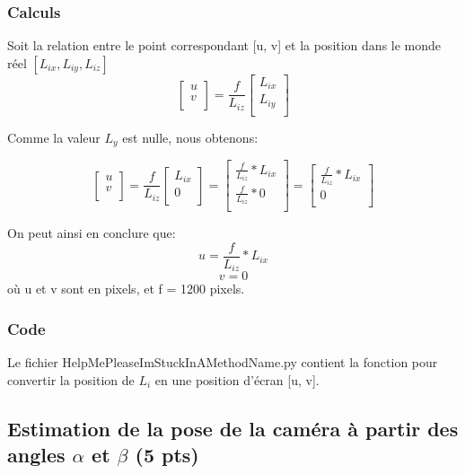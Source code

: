 \documentclass[12pt]{article}
\begin{document}
\subsubsection{Calculs}
Soit la relation entre le point correspondant [u, v] et la position dans le monde r\'eel $ [L_{ix}, L_{iy}, L_{iz}] $
\[ \left[ {\begin{array}{c}
                u \\
    v \\ \end{array} } \right] =
    \frac{f}{L_{iz}}
    \left[ {\begin{array}{c} L_{ix} \\ L_{iy} \\ \end{array}} \right]
\]

Comme la valeur $L_y$ est nulle, nous obtenons:


\[ \left[ {\begin{array}{c}
                u \\
    v \\ \end{array} } \right] =
    \frac{f}{L_{iz}}
    \left[ {\begin{array}{c} L_{ix} \\ 0 \\ \end{array}} \right]
=
    \left[ {\begin{array}{c} \frac{f}{L_{iz}} * L_{ix} \\ \frac{f}{L_{iz}} * 0 \\ \end{array}} \right]
=
    \left[ {\begin{array}{c} \frac{f}{L_{iz}} * L_{ix} \\ 0 \\ \end{array}} \right]

\]

On peut ainsi en conclure que:
\[
    u =  \frac{f}{L_{iz}} * L_{ix}
\]
\[
    v = 0
\]
o\`u u et v sont en pixels, et f = 1200 pixels.

\subsubsection{Code}

Le fichier HelpMePleaseImStuckInAMethodName.py contient la fonction pour convertir la position de $L_i$ en une position d'écran [u, v].

\subsection{Estimation de la pose de la caméra à partir des angles $\alpha$ et $\beta$ (5 pts)}
\end{document}
